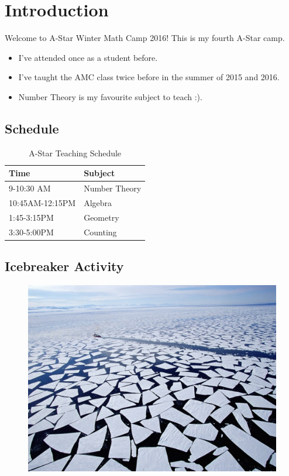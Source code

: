 \clearpage


\section{Introduction}

Welcome to A-Star Winter Math Camp 2016!  This is my fourth A-Star camp.  
\begin{itemize}
	\item  I've attended once as a student before.
	\item  I've taught the AMC class twice before in the summer of 2015 and 2016.
	\item Number Theory is my favourite subject to teach :).   
\end{itemize}


\clearpage


\subsection{Schedule}

\begin{table}[h]
	\centering
	\begin{tabular}{l l}
		\toprule
		\textbf{Time} & \textbf{Subject} \\
		\midrule
		9-10:30 AM & Number Theory \\
		10:45AM-12:15PM & Algebra \\ 
		1:45-3:15PM & Geometry \\
		3:30-5:00PM & Counting \\
		\bottomrule
	\end{tabular}
	\caption{A-Star Teaching Schedule}
\end{table}

\clearpage 
\subsection{Icebreaker Activity}

\begin{figure}[h]
	\centering\includegraphics[width=0.5\linewidth]{images/icebreaker.jpg}
\end{figure}

